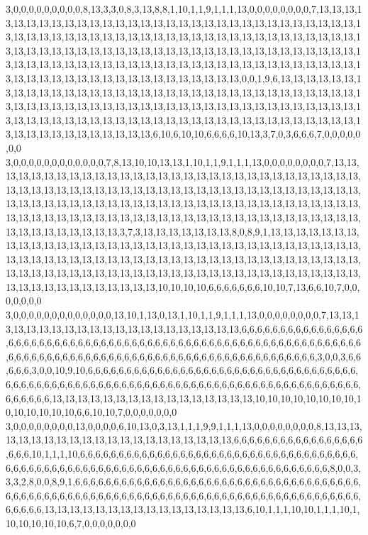 3,0,0,0,0,0,0,0,0,0,8,13,3,3,0,8,3,13,8,8,1,10,1,1,9,1,1,1,13,0,0,0,0,0,0,0,0,7,13,13,13,13,13,13,13,13,13,13,13,13,13,13,13,13,13,13,13,13,13,13,13,13,13,13,13,13,13,13,13,13,13,13,13,13,13,13,13,13,13,13,13,13,13,13,13,13,13,13,13,13,13,13,13,13,13,13,13,13,13,13,13,13,13,13,13,13,13,13,13,13,13,13,13,13,13,13,13,13,13,13,13,13,13,13,13,13,13,13,13,13,13,13,13,13,13,13,13,13,13,13,13,13,13,13,13,13,13,13,13,13,13,13,13,13,13,13,13,13,13,13,13,13,13,13,13,13,13,13,13,13,13,13,0,0,1,9,6,13,13,13,13,13,13,13,13,13,13,13,13,13,13,13,13,13,13,13,13,13,13,13,13,13,13,13,13,13,13,13,13,13,13,13,13,13,13,13,13,13,13,13,13,13,13,13,13,13,13,13,13,13,13,13,13,13,13,13,13,13,13,13,13,13,13,13,13,13,13,13,13,13,13,13,13,13,13,13,13,13,13,13,13,13,13,13,13,13,13,13,13,13,13,13,13,13,13,13,13,13,13,6,10,6,10,10,6,6,6,6,10,13,3,7,0,3,6,6,6,7,0,0,0,0,0,0,0
3,0,0,0,0,0,0,0,0,0,0,0,0,7,8,13,10,10,13,13,1,10,1,1,9,1,1,1,13,0,0,0,0,0,0,0,0,7,13,13,13,13,13,13,13,13,13,13,13,13,13,13,13,13,13,13,13,13,13,13,13,13,13,13,13,13,13,13,13,13,13,13,13,13,13,13,13,13,13,13,13,13,13,13,13,13,13,13,13,13,13,13,13,13,13,13,13,13,13,13,13,13,13,13,13,13,13,13,13,13,13,13,13,13,13,13,13,13,13,13,13,13,13,13,13,13,13,13,13,13,13,13,13,13,13,13,13,13,13,13,13,13,13,13,13,13,13,13,13,13,13,13,13,13,13,13,13,13,13,13,13,3,7,3,13,13,13,13,13,13,13,8,0,8,9,1,13,13,13,13,13,13,13,13,13,13,13,13,13,13,13,13,13,13,13,13,13,13,13,13,13,13,13,13,13,13,13,13,13,13,13,13,13,13,13,13,13,13,13,13,13,13,13,13,13,13,13,13,13,13,13,13,13,13,13,13,13,13,13,13,13,13,13,13,13,13,13,13,13,13,13,13,13,13,13,13,13,13,13,13,13,13,13,13,13,13,13,13,13,13,13,13,13,13,13,13,13,13,13,10,10,10,10,6,6,6,6,6,6,6,10,10,7,13,6,6,10,7,0,0,0,0,0,0,0
3,0,0,0,0,0,0,0,0,0,0,0,0,0,13,10,1,13,0,13,1,10,1,1,9,1,1,1,13,0,0,0,0,0,0,0,0,7,13,13,13,13,13,13,13,13,13,13,13,13,13,13,13,13,13,13,13,13,13,6,6,6,6,6,6,6,6,6,6,6,6,6,6,6,6,6,6,6,6,6,6,6,6,6,6,6,6,6,6,6,6,6,6,6,6,6,6,6,6,6,6,6,6,6,6,6,6,6,6,6,6,6,6,6,6,6,6,6,6,6,6,6,6,6,6,6,6,6,6,6,6,6,6,6,6,6,6,6,6,6,6,6,6,6,6,6,6,6,6,6,6,6,6,6,6,6,6,6,6,6,6,3,0,0,3,6,6,6,6,6,3,0,0,10,9,10,6,6,6,6,6,6,6,6,6,6,6,6,6,6,6,6,6,6,6,6,6,6,6,6,6,6,6,6,6,6,6,6,6,6,6,6,6,6,6,6,6,6,6,6,6,6,6,6,6,6,6,6,6,6,6,6,6,6,6,6,6,6,6,6,6,6,6,6,6,6,6,6,6,6,6,6,6,6,6,6,6,6,6,6,6,6,6,13,13,13,13,13,13,13,13,13,13,13,13,13,13,13,13,10,10,10,10,10,10,10,10,10,10,10,10,10,10,6,6,10,10,7,0,0,0,0,0,0,0
3,0,0,0,0,0,0,0,0,13,0,0,0,0,6,10,13,0,3,13,1,1,1,9,9,1,1,1,13,0,0,0,0,0,0,0,0,8,13,13,13,13,13,13,13,13,13,13,13,13,13,13,13,13,13,13,13,13,13,6,6,6,6,6,6,6,6,6,6,6,6,6,6,6,6,6,6,6,6,10,1,1,1,10,6,6,6,6,6,6,6,6,6,6,6,6,6,6,6,6,6,6,6,6,6,6,6,6,6,6,6,6,6,6,6,6,6,6,6,6,6,6,6,6,6,6,6,6,6,6,6,6,6,6,6,6,6,6,6,6,6,6,6,6,6,6,6,6,6,6,6,6,6,6,6,6,6,6,6,6,6,6,8,0,0,3,3,3,2,8,0,0,8,9,1,6,6,6,6,6,6,6,6,6,6,6,6,6,6,6,6,6,6,6,6,6,6,6,6,6,6,6,6,6,6,6,6,6,6,6,6,6,6,6,6,6,6,6,6,6,6,6,6,6,6,6,6,6,6,6,6,6,6,6,6,6,6,6,6,6,6,6,6,6,6,6,6,6,6,6,6,6,6,6,6,6,6,6,6,6,6,6,6,13,13,13,13,13,13,13,13,13,13,13,13,13,13,13,13,6,10,1,1,1,10,10,1,1,1,10,1,10,10,10,10,10,6,7,0,0,0,0,0,0,0
